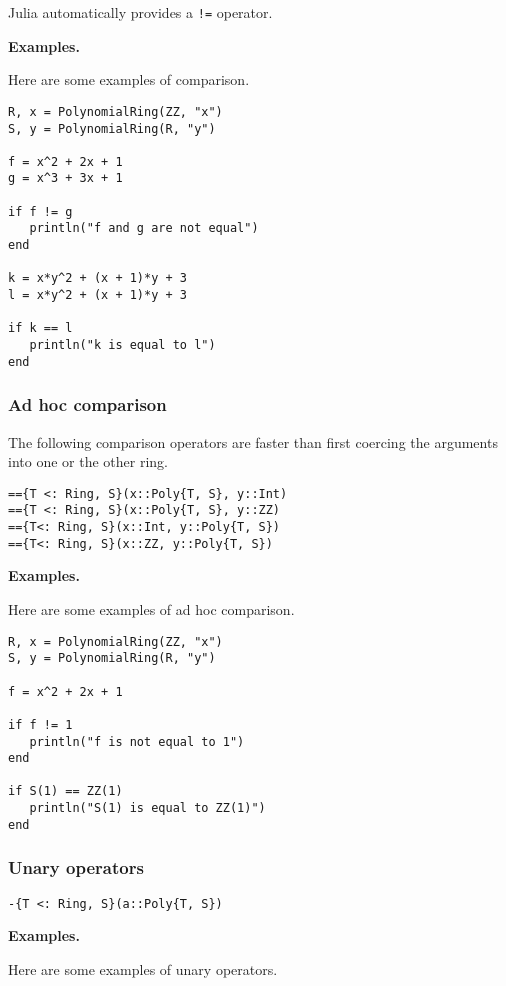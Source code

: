 \documentclass[a4paper,10pt]{article}
\newcommand{\code}{\lstinline}
\begin{document}
{{{Julia automatically provides a \code{!=} operator.

\textbf{Examples.}

Here are some examples of comparison.

\begin{lstlisting}
R, x = PolynomialRing(ZZ, "x")
S, y = PolynomialRing(R, "y")

f = x^2 + 2x + 1
g = x^3 + 3x + 1

if f != g
   println("f and g are not equal")
end

k = x*y^2 + (x + 1)*y + 3
l = x*y^2 + (x + 1)*y + 3

if k == l
   println("k is equal to l")
end
\end{lstlisting}

\subsubsection{Ad hoc comparison}

The following comparison operators are faster than first coercing the arguments
into one or the other ring.

\begin{lstlisting}
=={T <: Ring, S}(x::Poly{T, S}, y::Int)
=={T <: Ring, S}(x::Poly{T, S}, y::ZZ)
=={T<: Ring, S}(x::Int, y::Poly{T, S})
=={T<: Ring, S}(x::ZZ, y::Poly{T, S})
\end{lstlisting}

\textbf{Examples.}

Here are some examples of ad hoc comparison.

\begin{lstlisting}
R, x = PolynomialRing(ZZ, "x")
S, y = PolynomialRing(R, "y")

f = x^2 + 2x + 1

if f != 1
   println("f is not equal to 1")
end

if S(1) == ZZ(1)
   println("S(1) is equal to ZZ(1)")
end
\end{lstlisting}

\subsubsection{Unary operators}

\begin{lstlisting}
-{T <: Ring, S}(a::Poly{T, S})
\end{lstlisting}

\textbf{Examples.}

Here are some examples of unary operators.

}}}
\end{document}
